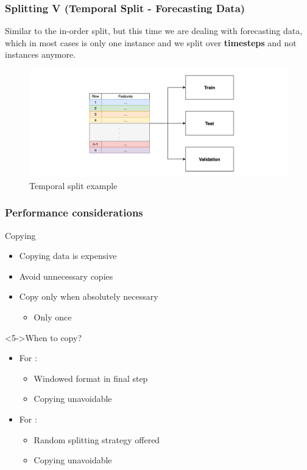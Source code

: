 \documentclass[t,english]{beamer}
\begin{document}
\begin{frame}
  \frametitle{Splitting V (Temporal Split - Forecasting Data)}
  Similar to the in-order split, but this time we are dealing with forecasting data, which in most cases is only one instance and we split over \textbf{timesteps} and not instances anymore.

  \begin{figure}[H]
    \includegraphics[width=1\textwidth]{figures/splitting/temporal_split.png}
    \caption{Temporal split example}
    \label{fig:temporal_split}
  \end{figure}
\end{frame}

\begin{frame}
  \frametitle{Performance considerations}

  \begin{block}{Copying}
    \begin{itemize}
      \item <1-> Copying data is expensive
      \item <2-> Avoid unnecessary copies
      \item <3-> Copy only when absolutely necessary
            \begin{itemize}
              \item <4-> Only once
            \end{itemize}
    \end{itemize}
  \end{block}

  \begin{block}<5->{When to copy?}
    \begin{itemize}
      \item<6-> For \forecastingDataSet:
            \begin{itemize}
              \item<7-> Windowed format in final step
              \item<8-> Copying unavoidable
            \end{itemize}
      \item<9-> For \classificationDataSet:
            \begin{itemize}
              \item<10-> Random splitting strategy offered
              \item<11-> Copying unavoidable
            \end{itemize}
    \end{itemize}

  \end{block}
\end{frame}
\end{document}
